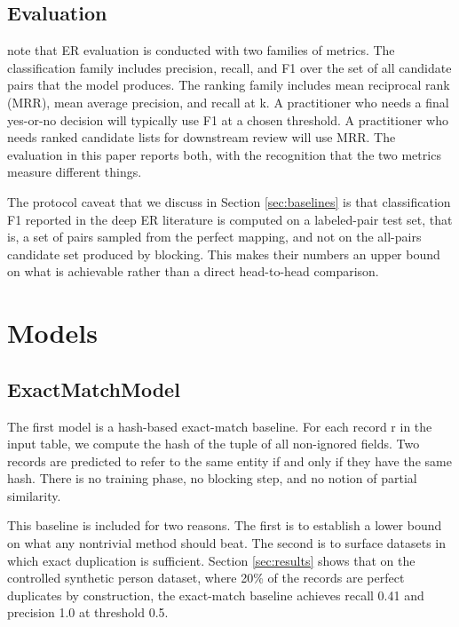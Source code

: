 \documentclass[10pt,letterpaper]{article}
\begin{document}
\subsection{Evaluation}

\citet{papadakis2021} note that ER evaluation is conducted with two
families of metrics. The classification family includes precision,
recall, and F1 over the set of all candidate pairs that the model
produces. The ranking family includes mean reciprocal rank (MRR), mean
average precision, and recall at k. A practitioner who needs a final
yes-or-no decision will typically use F1 at a chosen threshold. A
practitioner who needs ranked candidate lists for downstream review
will use MRR. The evaluation in this paper reports both, with the
recognition that the two metrics measure different things.

The protocol caveat that we discuss in Section \ref{sec:baselines} is
that classification F1 reported in the deep ER literature
\citep[e.g.,][]{mudgal2018, li2020} is computed on a labeled-pair test
set, that is, a set of pairs sampled from the perfect mapping, and not
on the all-pairs candidate set produced by blocking. This makes their
numbers an upper bound on what is achievable rather than a direct
head-to-head comparison.

\section{Models}
\label{sec:models}

\subsection{ExactMatchModel}

The first model is a hash-based exact-match baseline. For each record
r in the input table, we compute the hash of the tuple of all
non-ignored fields. Two records are predicted to refer to the same
entity if and only if they have the same hash. There is no training
phase, no blocking step, and no notion of partial similarity.

This baseline is included for two reasons. The first is to establish
a lower bound on what any nontrivial method should beat. The second is
to surface datasets in which exact duplication is sufficient. Section
\ref{sec:results} shows that on the controlled synthetic person
dataset, where 20\% of the records are perfect duplicates by
construction, the exact-match baseline achieves recall 0.41 and
precision 1.0 at threshold 0.5.
\end{document}
